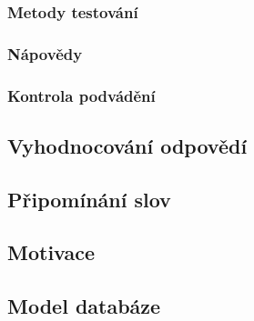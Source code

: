 \documentclass[a4paper,11pt,titlepage,fleqn]{article}
\begin{document}
        \subsubsection{Metody testování}
    
        \subsubsection{Nápovědy}

        \subsubsection{Kontrola podvádění}


    \subsection{Vyhodnocování odpovědí}

    \subsection{Připomínání slov}

    \subsection{Motivace}

    \subsection{Model databáze}
\end{document}
